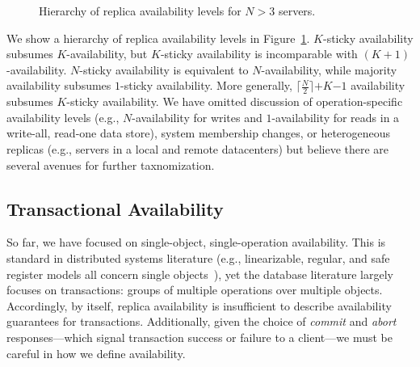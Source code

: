 \begin{figure}
\centering
{}
\caption{Hierarchy of replica availability levels for $N>3$ servers.}
\label{fig:availability-order}
\end{figure}

We show a hierarchy of replica availability levels in
Figure~\ref{fig:availability-order}. $K$-sticky availability subsumes
$K$-availability, but $K$-sticky availability is incomparable with
$(K+1)$-availability. $N$-sticky availability is equivalent to
$N$-availability, while majority availability subsumes $1$-sticky
availability. More generally, $\lceil \frac{N}{2} \rceil$$+$$K$$-$$1$
availability subsumes $K$-sticky availability. We have omitted
discussion of operation-specific availability levels (e.g.,
$N$-availability for writes and $1$-availability for reads in a
write-all, read-one data store), system membership changes, or
heterogeneous replicas (e.g., servers in a local and remote
datacenters) but believe there are several avenues for further
taxnomization.

\subsection{Transactional Availability}

So far, we have focused on single-object, single-operation
availability. This is standard in distributed systems literature
(e.g., linearizable, regular, and safe register models all concern
single objects~\cite{herlihy-art}), yet the database literature
largely focuses on transactions: groups of multiple operations over
multiple objects. Accordingly, by itself, replica availability is
insufficient to describe availability guarantees for
transactions. Additionally, given the choice of \textit{commit} and
\textit{abort} responses---which signal transaction success or failure
to a client---we must be careful in how we define availability.

